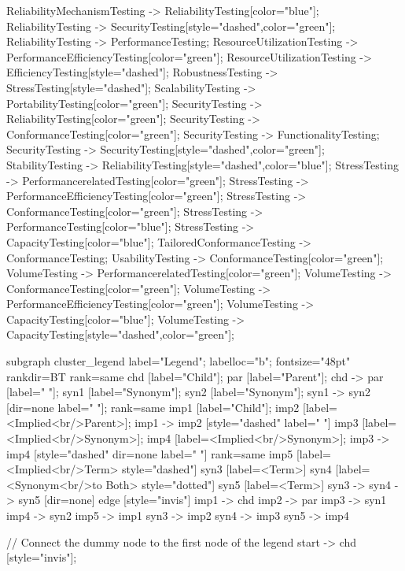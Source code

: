 \documentclass{article}
\begin{document}
{ReliabilityMechanismTesting -> ReliabilityTesting[color="blue"];
ReliabilityTesting -> SecurityTesting[style="dashed",color="green"];
ReliabilityTesting -> PerformanceTesting;
ResourceUtilizationTesting -> PerformanceEfficiencyTesting[color="green"];
ResourceUtilizationTesting -> EfficiencyTesting[style="dashed"];
RobustnessTesting -> StressTesting[style="dashed"];
ScalabilityTesting -> PortabilityTesting[color="green"];
SecurityTesting -> ReliabilityTesting[color="green"];
SecurityTesting -> ConformanceTesting[color="green"];
SecurityTesting -> FunctionalityTesting;
SecurityTesting -> SecurityTesting[style="dashed",color="green"];
StabilityTesting -> ReliabilityTesting[style="dashed",color="blue"];
StressTesting -> PerformancerelatedTesting[color="green"];
StressTesting -> PerformanceEfficiencyTesting[color="green"];
StressTesting -> ConformanceTesting[color="green"];
StressTesting -> PerformanceTesting[color="blue"];
StressTesting -> CapacityTesting[color="blue"];
TailoredConformanceTesting -> ConformanceTesting;
UsabilityTesting -> ConformanceTesting[color="green"];
VolumeTesting -> PerformancerelatedTesting[color="green"];
VolumeTesting -> ConformanceTesting[color="green"];
VolumeTesting -> PerformanceEfficiencyTesting[color="green"];
VolumeTesting -> CapacityTesting[color="blue"];
VolumeTesting -> CapacityTesting[style="dashed",color="green"];

subgraph cluster_legend {
    label="Legend";
    labelloc="b";
    fontsize="48pt"
    rankdir=BT
    {
        rank=same
        chd [label="Child"];
        par [label="Parent"];
        chd -> par [label="                "];
        syn1 [label="Synonym"];
        syn2 [label="Synonym"];
        syn1 -> syn2 [dir=none label="                "];
    }
    {
        rank=same
        imp1 [label="Child"];
        imp2 [label=<Implied<br/>Parent>];
        imp1 -> imp2 [style="dashed" label="                "]
        imp3 [label=<Implied<br/>Synonym>];
        imp4 [label=<Implied<br/>Synonym>];
        imp3 -> imp4 [style="dashed" dir=none label="                "]
    }
    {
        rank=same
        imp5 [label=<Implied<br/>Term> style="dashed"]
        syn3 [label=<Term>]
        syn4 [label=<Synonym<br/>to Both> style="dotted"]
        syn5 [label=<Term>]
        syn3 -> syn4 -> syn5 [dir=none]
    }
    edge [style="invis"]
    imp1 -> chd
    imp2 -> par
    imp3 -> syn1
    imp4 -> syn2
imp5 -> imp1
syn3 -> imp2
syn4 -> imp3
syn5 -> imp4
}

// Connect the dummy node to the first node of the legend
start -> chd [style="invis"];
}
\end{document}
